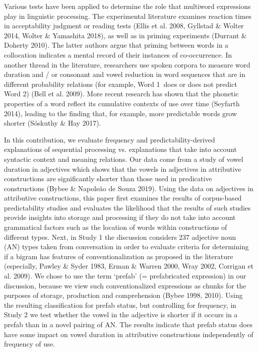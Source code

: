 \documentclass[12pt]{article}
\newcommand\textsubscript[1]{\ensuremath{{}_{\text{#1}}}}
\newenvironment{styleStandard}{\setlength\leftskip{0cm}\setlength\rightskip{0cm plus 1fil}\setlength\parindent{0cm}\setlength\parfillskip{0pt plus 1fil}\setlength\parskip{0in plus 1pt}\writerlistparindent\writerlistleftskip\leavevmode\normalfont\normalsize\writerlistlabel\ignorespaces}{\unskip\vspace{0.111in plus 0.0111in}\par}
\newcommand\writerlistleftskip{}
\newcommand\writerlistparindent{}
\newcommand\writerlistlabel{}
\begin{document}
\begin{styleStandard}
Various tests have been applied to determine the role that multiword expressions play in linguistic processing. The experimental literature examines reaction times in acceptability judgment or reading tests (Ellis et al. 2008, Gyllstad \& Wolter 2014, Wolter \& Yamashita 2018), as well as in priming experiments (Durrant \& Doherty 2010). The latter authors argue that priming between words in a collocation indicates a mental record of their instances of co-occurrence. In another thread in the literature, researchers use spoken corpora to measure word duration and / or consonant and vowel reduction in word sequences that are in different probability relations (for example, Word 1\textsubscript{ }does or does not predict Word 2) (Bell et al. 2009). More recent research has shown that the phonetic properties of a word reflect its cumulative contexts of use over time (Seyfarth 2014), leading to the finding that, for example, more predictable words grow shorter (Sóskuthy \& Hay 2017). 
\end{styleStandard}

\begin{styleStandard}
In this contribution, we evaluate frequency and predictability-derived explanations of sequential processing vs. explanations that take into account syntactic context and meaning relations. Our data come from a study of vowel duration in adjectives which shows that the vowels in adjectives in attributive constructions are significantly shorter than those used in predicative constructions (Bybee \& Napoleão de Souza 2019). Using the data on adjectives in attributive constructions, this paper first examines the results of corpus-based predictability studies and evaluates the likelihood that the results of such studies provide insights into storage and processing if they do not take into account grammatical factors such as the location of words within constructions of different types. Next, in Study 1 the discussion considers 237 adjective noun (AN) types taken from conversation in order to evaluate criteria for determining if a bigram has features of conventionalization as proposed in the literature (especially, Pawley \& Syder 1983, Erman \& Warren 2000, Wray 2002, Corrigan et al. 2009). We chose to use the term ‘prefab’ (= prefabricated expression) in our discussion, because we view such conventionalized expressions as chunks for the purposes of storage, production and comprehension (Bybee 1998, 2010). Using the resulting classification for prefab status, but controlling for frequency, in Study 2 we test whether the vowel in the adjective is shorter if it occurs in a prefab than in a novel pairing of AN. The results indicate that prefab status does have some impact on vowel duration in attributive constructions independently of frequency of use. 
\end{styleStandard}
\end{document}

